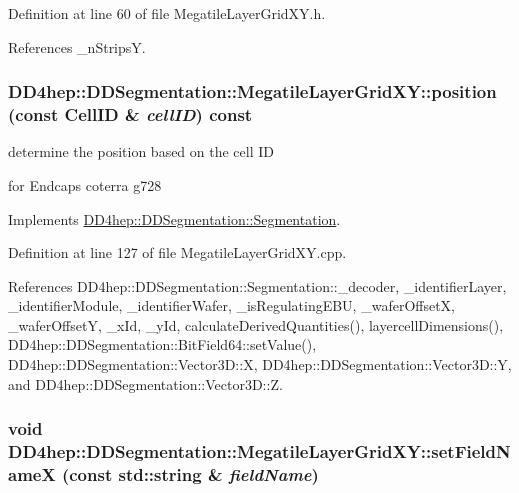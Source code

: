 Definition at line 60 of file MegatileLayerGridXY.h.

References \_\-nStripsY.\hypertarget{class_d_d4hep_1_1_d_d_segmentation_1_1_megatile_layer_grid_x_y_ab7f4500bd543bd2a837810f130b47539}{
\subsubsection[{position}]{ DD4hep::DDSegmentation::MegatileLayerGridXY::position (const {\bf CellID} \& {\em cellID}) const}}
\label{class_d_d4hep_1_1_d_d_segmentation_1_1_megatile_layer_grid_x_y_ab7f4500bd543bd2a837810f130b47539}


determine the position based on the cell ID 

for Endcaps coterra g728 

Implements \hyperlink{class_d_d4hep_1_1_d_d_segmentation_1_1_segmentation_a594fe6d78667415855858d083b64acad}{DD4hep::DDSegmentation::Segmentation}.

Definition at line 127 of file MegatileLayerGridXY.cpp.

References DD4hep::DDSegmentation::Segmentation::\_\-decoder, \_\-identifierLayer, \_\-identifierModule, \_\-identifierWafer, \_\-isRegulatingEBU, \_\-waferOffsetX, \_\-waferOffsetY, \_\-xId, \_\-yId, calculateDerivedQuantities(), layercellDimensions(), DD4hep::DDSegmentation::BitField64::setValue(), DD4hep::DDSegmentation::Vector3D::X, DD4hep::DDSegmentation::Vector3D::Y, and DD4hep::DDSegmentation::Vector3D::Z.\hypertarget{class_d_d4hep_1_1_d_d_segmentation_1_1_megatile_layer_grid_x_y_a3f1b9a1540d75d71d29df2c0b40da730}{
\subsubsection[{setFieldNameX}]{\setlength{\rightskip}{0pt plus 5cm}void DD4hep::DDSegmentation::MegatileLayerGridXY::setFieldNameX (const std::string \& {\em fieldName})}}
\label{class_d_d4hep_1_1_d_d_segmentation_1_1_megatile_layer_grid_x_y_a3f1b9a1540d75d71d29df2c0b40da730}


